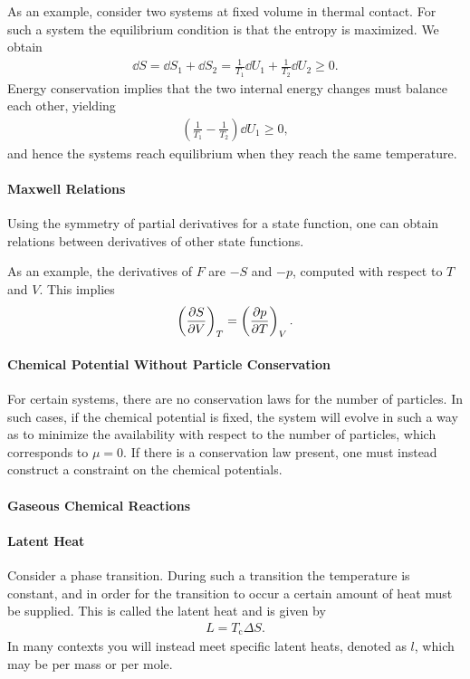 As an example, consider two systems at fixed volume in thermal contact. For such a system the equilibrium condition is that the entropy is maximized. We obtain
\begin{align*}
	\dd{S} = \dd{S_{1}} + \dd{S_{2}} = \frac{1}{T_{1}}\dd{U_{1}} + \frac{1}{T_{2}}\dd{U_{2}} \geq 0.
\end{align*}
Energy conservation implies that the two internal energy changes must balance each other, yielding
\begin{align*}
	\left(\frac{1}{T_{1}} - \frac{1}{T_{2}}\right)\dd{U_{1}} \geq 0,
\end{align*}
and hence the systems reach equilibrium when they reach the same temperature.

\paragraph{Maxwell Relations}
Using the symmetry of partial derivatives for a state function, one can obtain relations between derivatives of other state functions.

As an example, the derivatives of $F$ are $-S$ and $-p$, computed with respect to $T$ and $V$. This implies
\begin{align*}
	\left(\pdv{S}{V}\right)_{T} = \left(\pdv{p}{T}\right)_{V}.
\end{align*}

\paragraph{Chemical Potential Without Particle Conservation}
For certain systems, there are no conservation laws for the number of particles. In such cases, if the chemical potential is fixed, the system will evolve in such a way as to minimize the availability with respect to the number of particles, which corresponds to $\mu = 0$. If there is a conservation law present, one must instead construct a constraint on the chemical potentials.

\paragraph{Gaseous Chemical Reactions}

\paragraph{Latent Heat}
Consider a phase transition. During such a transition the temperature is constant, and in order for the transition to occur a certain amount of heat must be supplied. This is called the latent heat and is given by
\begin{align*}
	L = T_{\text{c}}\Delta S.
\end{align*}
In many contexts you will instead meet specific latent heats, denoted as $l$, which may be per mass or per mole.

